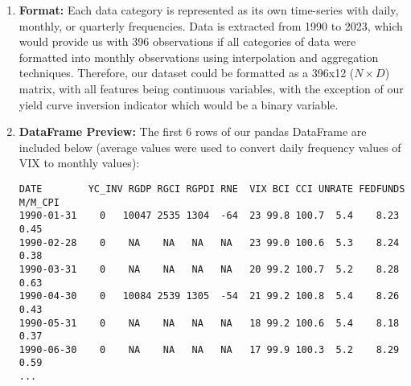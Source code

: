 \documentclass[11pt]{article}
\begin{document}
\begin{enumerate}[itemsep=0em,label={(\alph*)}]
\begin{enumerate}[itemsep=0em,label={\roman*.}]
  \end{enumerate}
\item \textbf{Format:} Each data category is represented as its own time-series with daily, monthly, or quarterly frequencies. Data is extracted from 1990 to 2023, which would provide us with 396 observations if all categories of data were formatted into monthly observations using interpolation and aggregation techniques. Therefore, our dataset could be formatted as a 396x12 ($N\times D$) matrix, with all features being continuous variables, with the exception of our yield curve inversion indicator which would be a binary variable. 
\item \textbf{DataFrame Preview:} The first 6 rows of our pandas DataFrame are included below (average values were used to convert daily frequency values of VIX to monthly values):
\begin{verbatim}
DATE        YC_INV RGDP RGCI RGPDI RNE  VIX BCI CCI UNRATE FEDFUNDS M/M_CPI   
1990-01-31    0   10047 2535 1304  -64  23 99.8 100.7  5.4    8.23    0.45
1990-02-28    0    NA    NA   NA   NA   23 99.0 100.6  5.3    8.24    0.38
1990-03-31    0    NA    NA   NA   NA   20 99.2 100.7  5.2    8.28    0.63
1990-04-30    0   10084 2539 1305  -54  21 99.2 100.8  5.4    8.26    0.43
1990-05-31    0    NA    NA   NA   NA   18 99.2 100.6  5.4    8.18    0.37
1990-06-30    0    NA    NA   NA   NA   17 99.9 100.3  5.2    8.29    0.59
...
\end{verbatim}


\end{enumerate}
\end{document}
